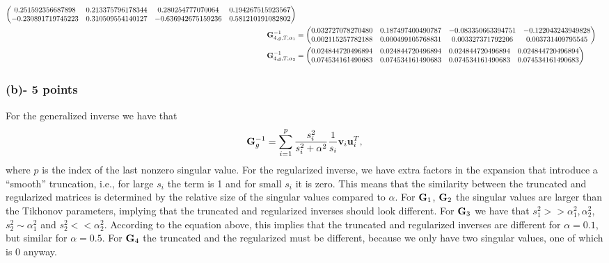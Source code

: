 \documentclass[11pt]{article}
\begin{document}
\begin{subequations}
\begin{align}
\begin{pmatrix}
   0.251592356687898  & 0.213375796178344 &  0.280254777070064 &  0.194267515923567\\
  -0.230891719745223  & 0.310509554140127 & -0.636942675159236 &  0.581210191082802
\end{pmatrix}\\
\nonumber\mathbf{G}_{4,g,T,\alpha_1}^{-1} &= 
\begin{pmatrix}
   0.032727078270480  & 0.187497400490787 & -0.083350663394751 & -0.122043243949828\\
   0.002115257782188 &  0.000499105768831 &  0.003327371792206  & 0.003731409795545
\end{pmatrix}\\
\nonumber\mathbf{G}_{4,g,T,\alpha_2}^{-1} &= 
\begin{pmatrix}
   0.024844720496894 &  0.024844720496894  & 0.024844720496894  & 0.024844720496894\\
   0.074534161490683  & 0.074534161490683 &  0.074534161490683  & 0.074534161490683
\end{pmatrix}
\end{align}
\end{subequations}

\subsubsection*{(b)- 5 points}

For the generalized inverse we have that
\begin{equation}
\mathbf{G}_g^{-1} = \sum_{i=1}^p \frac{s_i^2}{s_i^2+\alpha^2}\frac{1}{s_i}\mathbf{v}_i
\mathbf{u}_i^T,
\end{equation}
where $p$ is the index of the last nonzero singular value. For the regularized inverse, we have extra factors in the expansion that introduce a ``smooth'' truncation, i.e., for large $s_i$ the term is 1 and for small $s_i$ it is zero. This means that the similarity between the truncated and regularized matrices is determined by the relative size of the singular values compared to $\alpha$. For $\mathbf{G}_1$, $\mathbf{G}_2$ the singular values are larger than the Tikhonov parameters, implying that the truncated and regularized inverses should look different. For $\mathbf{G}_3$ we have that $s_1^2 >> \alpha_1^2, \alpha_2^2$, $s_2^2 \sim \alpha_1^2$ and $s_2^2 << \alpha_2^2$. According to the equation above, this implies that the truncated and regularized inverses are different for $\alpha=0.1$, but similar for $\alpha=0.5$. For $\mathbf{G}_4$ the truncated and the regularized must be different, because we only have two singular values, one of which is $0$ anyway.
\end{document}
